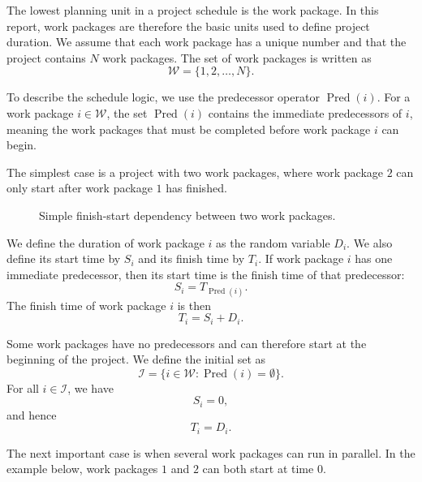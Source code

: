 \documentclass[11pt,a4paper]{article}
\newcommand{\cI}{\mathcal{I}}
\newcommand{\1}{\mathbf{1}}
\newcommand{\Pred}{\operatorname{Pred}}
\theoremstyle{definition}
\theoremstyle{plain}
\theoremstyle{remark}
\numberwithin{equation}{section}
\begin{document}
The lowest planning unit in a project schedule is the work package. In this report, work packages are therefore the basic units used to define project duration. We assume that each work package has a unique number and that the project contains $N$ work packages. The set of work packages is written as
\[
\mathcal{W}=\{1,2,\ldots,N\}.
\]

To describe the schedule logic, we use the predecessor operator $\Pred(i)$. For a work package $i\in\mathcal{W}$, the set $\Pred(i)$ contains the immediate predecessors of $i$, meaning the work packages that must be completed before work package $i$ can begin.

The simplest case is a project with two work packages, where work package $2$ can only start after work package $1$ has finished.

\begin{figure}[H]
\centering
{}
\caption{Simple finish-start dependency between two work packages.}
\label{fig:two-work-packages}
\end{figure}

We define the duration of work package $i$ as the random variable $D_i$. We also define its start time by $S_i$ and its finish time by $T_i$. If work package $i$ has one immediate predecessor, then its start time is the finish time of that predecessor:
\[
S_i=T_{\Pred(i)}.
\]
The finish time of work package $i$ is then
\[
T_i=S_i+D_i.
\]

Some work packages have no predecessors and can therefore start at the beginning of the project. We define the initial set as
\[
\cI=\{i\in\mathcal{W}:\Pred(i)=\emptyset\}.
\]
For all $i\in\cI$, we have
\[
S_i=0,
\]
and hence
\[
T_i=D_i.
\]

The next important case is when several work packages can run in parallel. In the example below, work packages $1$ and $2$ can both start at time $0$.
\end{document}
